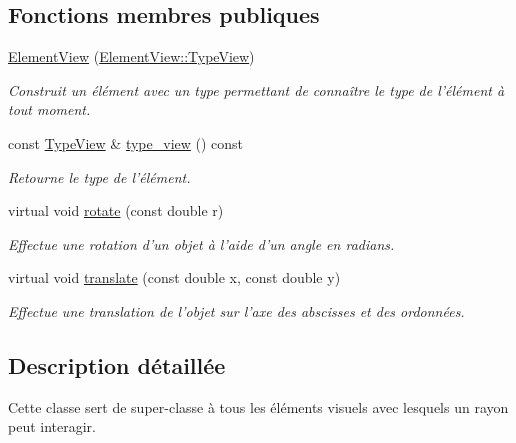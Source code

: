 \subsection*{Fonctions membres publiques}
\begin{DoxyCompactItemize}
\item 
\hypertarget{classElementView_adb918caf5a5fcc4bd945cd3cd2596f8c}{\hyperlink{classElementView_adb918caf5a5fcc4bd945cd3cd2596f8c}{Element\+View} (\hyperlink{classElementView_ae8b9890c6c8501a7a759896cae9ab7a6}{Element\+View\+::\+Type\+View})}\label{classElementView_adb918caf5a5fcc4bd945cd3cd2596f8c}

\begin{DoxyCompactList}\small\item\em Construit un élément avec un type permettant de connaître le type de l'élément à tout moment. \end{DoxyCompactList}\item 
const \hyperlink{classElementView_ae8b9890c6c8501a7a759896cae9ab7a6}{Type\+View} \& \hyperlink{classElementView_a30b7a26b428be68dcc4d8f72a0f9cd0b}{type\+\_\+view} () const 
\begin{DoxyCompactList}\small\item\em Retourne le type de l'élément. \end{DoxyCompactList}\item 
virtual void \hyperlink{classElementView_a18589409290f23edffdaeccdd7acb015}{rotate} (const double r)
\begin{DoxyCompactList}\small\item\em Effectue une rotation d’un objet à l’aide d’un angle en radians. \end{DoxyCompactList}\item 
virtual void \hyperlink{classElementView_a69a525cb674a36e33be6a8b7a6e4b83c}{translate} (const double x, const double y)
\begin{DoxyCompactList}\small\item\em Effectue une translation de l’objet sur l’axe des abscisses et des ordonnées. \end{DoxyCompactList}\end{DoxyCompactItemize}


\subsection{Description détaillée}
Cette classe sert de super-\/classe à tous les éléments visuels avec lesquels un rayon peut interagir. 

